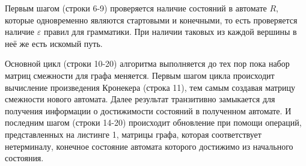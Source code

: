 Первым шагом (строки 6-9) проверяется наличие состояний в автомате $R$, которые одновременно являются стартовыми и конечными, то есть проверяется наличие $\varepsilon$ правил для грамматики. При наличии таковых из каждой вершины в неё же есть искомый путь.

Основной цикл (строки 10-20) алгоритма выполняется до тех пор пока набор матриц смежности для графа меняется. Первым шагом цикла происходит вычисление произведения Кронекера (строка 11), тем самым создавая матрицу смежности нового автомата. Далее результат транзитивно замыкается для получения информации о достижимости состояний в полученном автомате. И последним шагом (строки 14-20) происходит обновление при помощи операций, представленных на листинге 1, матрицы графа, которая соответствует нетерминалу, конечное состояние автомата которого достижимо из начального состояния.



